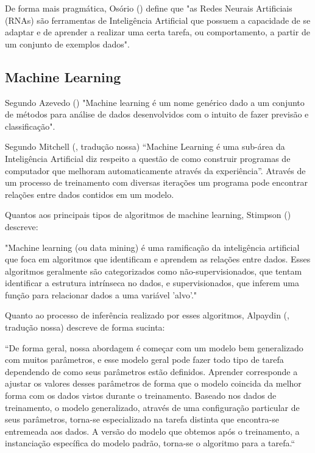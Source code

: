 De forma mais pragmática, Osório (\citeyear{osorio20}) define que "as Redes Neurais Artificiais (RNAs) são ferramentas de Inteligência Artificial que possuem a capacidade de se adaptar e de aprender a realizar uma certa tarefa, ou comportamento, a partir de um conjunto de exemplos dados". 

\subsection {Machine Learning}

Segundo Azevedo (\citeyear{azevedo19}) "Machine learning é um nome genérico dado a um conjunto de métodos para análise de dados desenvolvidos com o intuito de fazer previsão e classificação".

Segundo Mitchell (\citeyear{mitchell97}, tradução nossa) “Machine Learning é uma sub-área da Inteligência Artificial diz respeito a questão de como construir programas de computador que melhoram automaticamente através da experiência”. Através de um processo de treinamento com diversas iterações um programa pode encontrar relações entre dados contidos em um modelo. 

Quantos aos principais tipos de algoritmos de machine learning, Stimpson (\citeyear{stimpson14}) descreve:

\begin{citacao}
"Machine learning (ou data mining) é uma ramificação da inteligência artificial que foca em algoritmos que identificam e aprendem as relações entre dados. Esses algoritmos geralmente são categorizados como não-supervisionados, que tentam identificar a estrutura intrínseca no dados, e supervisionados, que inferem uma função para relacionar dados a uma variável 'alvo'."
\end{citacao}

Quanto ao processo de inferência realizado por esses algoritmos, Alpaydin (\citeyear{alpa20}, tradução nossa) descreve de forma sucinta:

\begin{citacao}
“De forma geral, nossa abordagem é começar com um modelo bem generalizado com muitos parâmetros, e esse modelo geral pode fazer todo tipo de tarefa dependendo de como seus parâmetros estão definidos. Aprender corresponde a ajustar os valores desses parâmetros de forma que o modelo coincida da melhor forma com os dados vistos durante o treinamento. Baseado nos dados de treinamento, o modelo generalizado, através de uma configuração particular de seus parâmetros, torna-se especializado na tarefa distinta que encontra-se entremeada aos dados. A versão do modelo que obtemos após o treinamento, a instanciação específica do modelo padrão, torna-se o algoritmo para a tarefa.“
\end{citacao}

